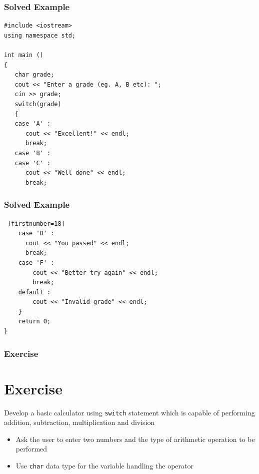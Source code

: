 \documentclass{beamer}
\begin{document}
\begin{frame} [fragile]
    \frametitle{Solved Example}
    \lstset{style=mystyle}
    \begin{lstlisting}
#include <iostream>
using namespace std;

int main ()
{
   char grade;
   cout << "Enter a grade (eg. A, B etc): ";
   cin >> grade;
   switch(grade)
   {
   case 'A' :
      cout << "Excellent!" << endl;
      break;
   case 'B' :
   case 'C' :
      cout << "Well done" << endl;
      break;

\end{lstlisting}
\end{frame}

\begin{frame} [fragile]
    \frametitle{Solved Example}
    \lstset{style=mystyle}
    \begin{lstlisting} [firstnumber=18]
    case 'D' :
      cout << "You passed" << endl;
      break;
    case 'F' :
        cout << "Better try again" << endl;
        break;
    default :
        cout << "Invalid grade" << endl;
    }
    return 0;
}
\end{lstlisting}
\end{frame}

\begin{frame}
    \frametitle{Exercise}
    \section{Exercise} %
    \label{sec:exercise}
    Develop a basic calculator using \texttt{switch} statement which is capable of performing addition, subtraction, multiplication and division
    \begin{itemize}
        \item Ask the user to enter two numbers and the type of arithmetic operation to be performed
        \item Use \texttt{char} data type for the variable handling the operator
    \end{itemize}
\end{frame}
\end{document}
